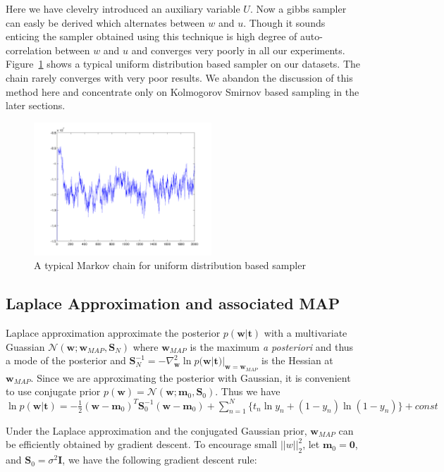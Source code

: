 Here we have clevelry introduced an auxiliary variable $U$.
Now a gibbs sampler can easly be derived which alternates between $w$ and $u$.
Though it sounds enticing the sampler obtained using this technique is high
degree of auto-correlation between $w$ and $u$ and converges very poorly in all
our experiments. Figure~\ref{fig:uniformSamplerChain} shows a typical uniform
distribution based sampler on our datasets. The chain rarely converges with very
poor results. We abandon the discussion of this method here and
concentrate only on Kolmogorov Smirnov based sampling in the later sections.

\begin{figure}[t]
\label{fig:laplace}
\centering
\includegraphics[height=5.0cm]{results/uniformSampleChain.png}

\caption{A typical Markov chain for uniform distribution based sampler }

\label{fig:uniformSamplerChain}
\end{figure}


\subsection{Laplace Approximation and associated MAP}

Laplace approximation approximate the posterior $p(\bm{w}|\bm{t})$ with a
multivariate Guassian $\mathcal{N}(\bm{w}; \bm{w}_{MAP}, \bm{S}_N)$ where
$\bm{w}_{MAP}$ is the maximum {\it a posteriori} and thus a mode of the
posterior and $\bm{S}_N^{-1} = -\nabla^2_{\bm{w}} \ln
p(\bm{w}|\bm{t})|_{\bm{w} = \bm{w}_{MAP}}$ is the Hessian at $\bm{w}_{MAP}$.
Since we are approximating the posterior with Gaussian, it is convenient to
use conjugate prior $p(\bm{w}) = \mathcal{N}(\bm{w};\bm{m}_0,\bm{S}_0)$. Thus
we have $\ln p(\bm{w}|\bm{t}) = -\frac{1}{2}(\bm{w}-\bm{m}_0)^T
\bm{S}_0^{-1}(\bm{w}-\bm{m}_0) + \sum_{n=1}^N\{t_n \ln y_n +(1-y_n) \ln
(1-y_n)\} + const$

Under the Laplace approximation and the conjugated Gaussian prior, $\bm{w}_{MAP}$
can be efficiently obtained by gradient descent. To encourage small
$||w||^2_2$, let $\bm{m}_0 = \bm{0}$, and $\bm{S}_0 = \sigma^2 \bm{I}$, we
have the following gradient descent rule: 

